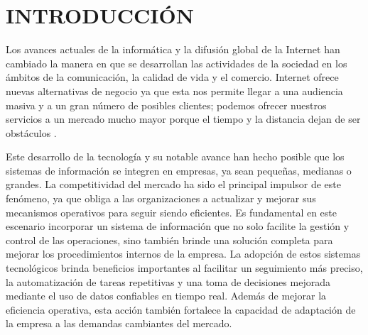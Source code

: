 \chapter{INTRODUCCIÓN}

	\vspace{10pt}

	Los avances actuales de la informática y la difusión global de la Internet han cambiado la manera en que se desarrollan las actividades de la sociedad en los ámbitos de la comunicación, la calidad de vida y el comercio. Internet ofrece nuevas alternativas de negocio ya que esta nos permite llegar a una audiencia masiva y a un gran número de posibles clientes; podemos ofrecer nuestros servicios a un mercado mucho mayor porque el tiempo y la distancia dejan de ser obstáculos \parencite{anormaliza2009implementacion}.
	
	
	Este desarrollo de la tecnología y su notable avance han hecho posible que los sistemas de información se integren en empresas, ya sean pequeñas, medianas o grandes. La competitividad del mercado ha sido el principal impulsor de este fenómeno, ya que obliga a las organizaciones a actualizar y mejorar sus mecanismos operativos para seguir siendo eficientes. Es fundamental en este escenario incorporar un sistema de información que no solo facilite la gestión y control de las operaciones, sino también brinde una solución completa para mejorar los procedimientos internos de la empresa. La adopción de estos sistemas tecnológicos brinda beneficios importantes al facilitar un seguimiento más preciso, la automatización de tareas repetitivas y una toma de decisiones mejorada mediante el uso de datos confiables en tiempo real. Además de mejorar la eficiencia operativa, esta acción también fortalece la capacidad de adaptación de la empresa a las demandas cambiantes del mercado.
	
